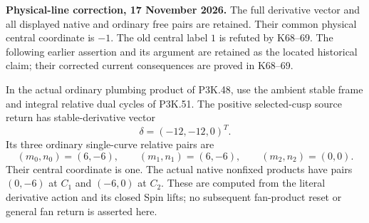 \begin{theorem}\label{night:P3K.52}
\par\noindent\textbf{Physical-line correction, 17 November 2026.} The full derivative vector and all displayed native and ordinary free pairs are retained. Their common physical central coordinate is \(-1\). The old central label \(1\) is refuted by K68--69. The following earlier assertion and its argument are retained as the located historical claim; their corrected current consequences are proved in K68--69.\medskip\par 
In the actual ordinary plumbing product of P3K.48, use the ambient
stable frame and integral relative dual cycles of P3K.51. The
positive selected-cusp source return has stable-derivative vector
\[
 \delta=(-12,-12,0)^T.
\]
Its three ordinary single-curve relative pairs are
\[
 (m_0,n_0)=(6,-6),\qquad(m_1,n_1)=(6,-6),\qquad
 (m_2,n_2)=(0,0).
\]
Their central coordinate is one. The actual native nonfixed products
have pairs \((0,-6)\) at \(C_1\) and \((-6,0)\) at \(C_2\).
These are computed from the literal derivative action and its
closed Spin lifts; no subsequent fan-product reset or general fan
return is asserted here.
\end{theorem}
